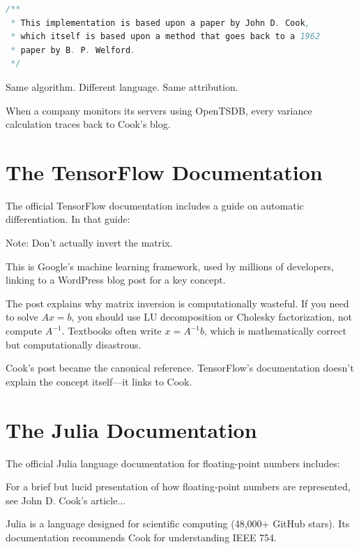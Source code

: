\begin{lstlisting}[language=java]
/**
 * This implementation is based upon a paper by John D. Cook,
 * which itself is based upon a method that goes back to a 1962
 * paper by B. P. Welford.
 */
\end{lstlisting}

Same algorithm. Different language. Same attribution.

When a company monitors its servers using OpenTSDB, every variance calculation traces back to Cook's blog.

\bigskip

\section*{The TensorFlow Documentation}

The official TensorFlow documentation includes a guide on automatic differentiation. In that guide:

\begin{blogquote}
Note: Don't actually invert the matrix.
\end{blogquote}

This is Google's machine learning framework, used by millions of developers, linking to a WordPress blog post for a key concept.

The post explains why matrix inversion is computationally wasteful. If you need to solve $Ax = b$, you should use LU decomposition or Cholesky factorization, not compute $A^{-1}$. Textbooks often write $x = A^{-1}b$, which is mathematically correct but computationally disastrous.

Cook's post became the canonical reference. TensorFlow's documentation doesn't explain the concept itself---it links to Cook.

\bigskip

\section*{The Julia Documentation}

The official Julia language documentation for floating-point numbers includes:

\begin{blogquote}
For a brief but lucid presentation of how floating-point numbers are represented, see John D. Cook's article...
\end{blogquote}

Julia is a language designed for scientific computing (48,000+ GitHub stars). Its documentation recommends Cook for understanding IEEE 754.

